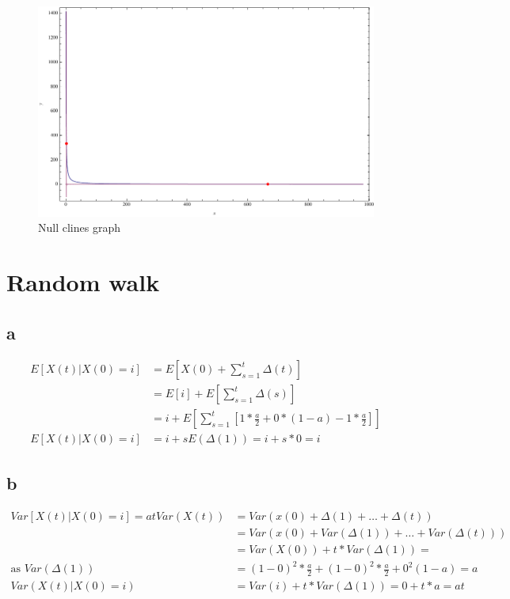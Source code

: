 \begin{figure}[htbp]
\centering
\includegraphics[scale=0.6]{./images/graph02}
\caption{Null clines graph}
\label{fig:graph02}
\end{figure}


\setcounter{chapter}{3}
\setcounter{section}{0}
\section{Random walk}
\subsection{a}
\begin{align*}
E[X(t) | X(0)  = i ] &= E[X(0) + \sum\limits_{s=1}^{t} \Delta(t) ] \\
&= E[i] + E\left[  \sum\limits_{s=1}^{t} \Delta(s) \right] \\
&= i + E \left[ \sum\limits_{s=1}^{t} \left[1 * \frac{a}{2} + 0 * (1-a) -1*\frac{a}{2}\right] \right]\\
E[X(t) | X(0)  = i ] &= i + sE(\Delta(1)) = i + s*0 = i
\end{align*}
\subsection{b}
\begin{align*}
Var[X(t) | X(0) = i] = at
Var(X(t)) &= Var(x(0) + \Delta(1) + \dots + \Delta(t))\\
&= Var(x(0) + Var(\Delta(1)) + \dots + Var(\Delta(t)))\\
&=Var(X(0)) + t*Var(\Delta(1)) = \\
\text{as }Var(\Delta(1)) &= (1-0)^2 *  \frac{a}{2} + (1-0)^2 * \frac{a}{2} + 0^2(1-a) = a\\
Var(X(t)|X(0) = i ) &= Var(i) + t* Var(\Delta(1)) = 0 + t*a = at
\end{align*}

